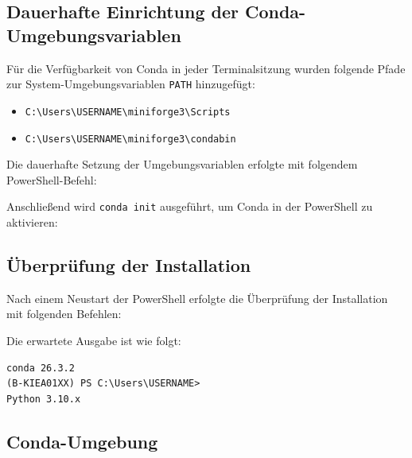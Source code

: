 \subsection{Dauerhafte Einrichtung der Conda-Umgebungsvariablen}

Für die Verfügbarkeit von Conda in jeder Terminalsitzung wurden folgende Pfade zur System-Umgebungsvariablen \texttt{PATH} hinzugefügt:

\begin{itemize}
    \item \texttt{C:\textbackslash Users\textbackslash USERNAME\textbackslash miniforge3\textbackslash Scripts}
    \item \texttt{C:\textbackslash Users\textbackslash USERNAME\textbackslash miniforge3\textbackslash condabin}
\end{itemize}

Die dauerhafte Setzung der Umgebungsvariablen erfolgte mit folgendem PowerShell-Befehl:



Anschließend wird \texttt{conda init} ausgeführt, um Conda in der PowerShell zu aktivieren:



\subsection{Überprüfung der Installation}

Nach einem Neustart der PowerShell erfolgte die Überprüfung der Installation mit folgenden Befehlen:



Die erwartete Ausgabe ist wie folgt:

\begin{lstlisting}[style=console]
conda 26.3.2
(B-KIEA01XX) PS C:\Users\USERNAME>
Python 3.10.x
\end{lstlisting}

\subsection{Conda-Umgebung}

